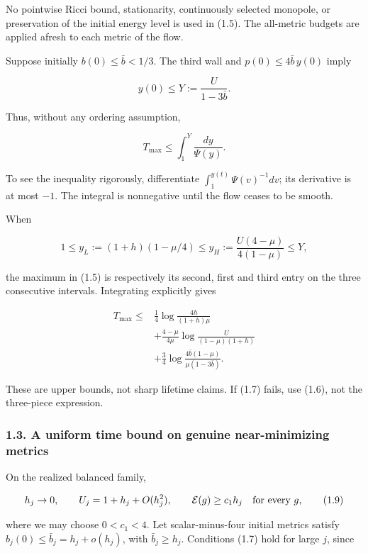 \documentclass[
  10pt,
]{article}
\begin{document}
No pointwise Ricci bound, stationarity, continuously selected monopole,
or preservation of the initial energy level is used in (1.5). The
all-metric budgets are applied afresh to each metric of the flow.

Suppose initially \(b(0)\le\bar b<1/3\). The third wall and
\(p(0)\le4\bar b\,y(0)\) imply

\[
 y(0)\le Y:=\frac U{1-3\bar b}.
\]

Thus, without any ordering assumption,

\[
                 T_{\max}\le\int_1^Y\frac{dy}{\Psi(y)}.       \tag{1.6}
\]

To see the inequality rigorously, differentiate
\(\int_1^{y(t)}\Psi(v)^{-1}dv\); its derivative is at most \(-1\). The
integral is nonnegative until the flow ceases to be smooth.

When

\[
 1\le y_L:=(1+h)(1-\mu/4)
 \le y_H:=\frac{U(4-\mu)}{4(1-\mu)}\le Y,            \tag{1.7}
\]

the maximum in (1.5) is respectively its second, first and third entry
on the three consecutive intervals. Integrating explicitly gives

\[
\boxed{\begin{aligned}
 T_{\max}\le{}&\frac14\log\frac{4h}{(1+h)\mu}\\
 &+\frac{4-\mu}{4\mu}
             \log\frac U{(1-\mu)(1+h)}\\
 &+\frac34\log\frac{4\bar b(1-\mu)}
                              {\mu(1-3\bar b)}.
\end{aligned}}                                                   \tag{1.8}
\]

These are upper bounds, not sharp lifetime claims. If (1.7) fails, use
(1.6), not the three-piece expression.

\hypertarget{a-uniform-time-bound-on-genuine-near-minimizing-metrics}{%
\subsubsection{1.3. A uniform time bound on genuine near-minimizing
metrics}\label{a-uniform-time-bound-on-genuine-near-minimizing-metrics}}

On the realized balanced family,

\[
 h_j\to0,\qquad U_j=1+h_j+O(h_j^2),\qquad
 \mathcal E(g)\ge c_1h_j\quad\hbox{for every }g,       \tag{1.9}
\]

where we may choose \(0<c_1<4\). Let scalar-minus-four initial metrics
satisfy \(b_j(0)\le\bar b_j=h_j+o(h_j)\), with \(\bar b_j\ge h_j\).
Conditions (1.7) hold for large \(j\), since
\end{document}
